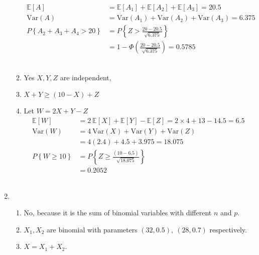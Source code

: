 \begin{enumerate}
\begin{enumerate}
			\begin{align}
				\mathbb{E}[A] &= \mathbb{E}[A_1] + \mathbb{E}[A_2] + \mathbb{E}[A_3] = 20.5 \nonumber \\
				\mathrm{Var}(A) &= \mathrm{Var}(A_1) + \mathrm{Var}(A_2) + \mathrm{Var}(A_3) = 6.375 \nonumber \\
				P\left\{ A_2 + A_3 + A_4 > 20 \right\} &= P \left\{ Z > \frac{20 - 20.5}{\sqrt{6.375}} \right\} \nonumber \\
				&= 1 - \Phi \left( \frac{20 - 20.5}{\sqrt{6.375}} \right) = 0.5785
			\end{align}\\
			
			\item Yes $ X, Y, Z $ are independent, \\
			
			\item $ X + Y \geq (10-X) + Z $ \\
			
			\item Let $ W = 2X + Y - Z $ \\
			\begin{align}
				\mathbb{E}[W] &= 2\ \mathbb{E}[X] + \mathbb{E}[Y] - \mathbb{E}[Z] = 2 \times 4 + 13 - 14.5 = 6.5 \nonumber \\
				\mathrm{Var}(W) &= 4\ \mathrm{Var}(X) + \mathrm{Var}(Y) + \mathrm{Var}(Z) \nonumber \\ 
				&= 4 (2.4) + 4.5 + 3.975 = 18.075  \nonumber \\
				P \left\{W \geq 10 \right\} &= P \left\{ Z \geq \frac{(10 - 6.5)}{\sqrt{18.075}} \right\} \nonumber \\
				&= 0.2052
			\end{align}\\
		\end{enumerate}
	
	
	\item
	
		\begin{enumerate}
			\item No, because it is the sum of binomial variables with different $ n $ and $ p $.\\
			
			\item $ X_1, X_2 $ are binomial with parameters $ (32, 0.5), \ (28, 0.7) $ respectively.\\
			
			\item $ X = X_1 + X_2 $.\\
			

\end{enumerate}
\end{enumerate}
